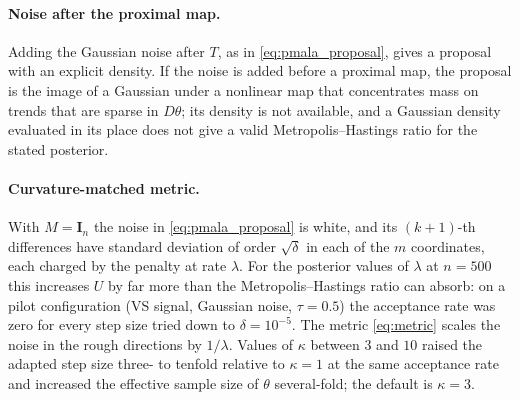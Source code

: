 \paragraph{Noise after the proximal map.} Adding the Gaussian noise after $T$, as in \eqref{eq:pmala_proposal}, gives a proposal with an explicit density. If the noise is added before a proximal map, the proposal is the image of a Gaussian under a nonlinear map that concentrates mass on trends that are sparse in $D\theta$; its density is not available, and a Gaussian density evaluated in its place does not give a valid Metropolis--Hastings ratio for the stated posterior.

\paragraph{Curvature-matched metric.} With $M = \mathbf{I}_n$ the noise in \eqref{eq:pmala_proposal} is white, and its $(k+1)$-th differences have standard deviation of order $\sqrt{\delta}$ in each of the $m$ coordinates, each charged by the penalty at rate $\lambda$. For the posterior values of $\lambda$ at $n = 500$ this increases $U$ by far more than the Metropolis--Hastings ratio can absorb: on a pilot configuration (VS signal, Gaussian noise, $\tau = 0.5$) the acceptance rate was zero for every step size tried down to $\delta = 10^{-5}$. The metric \eqref{eq:metric} scales the noise in the rough directions by $1/\lambda$. Values of $\kappa$ between $3$ and $10$ raised the adapted step size three- to tenfold relative to $\kappa = 1$ at the same acceptance rate and increased the effective sample size of $\theta$ several-fold; the default is $\kappa = 3$.

